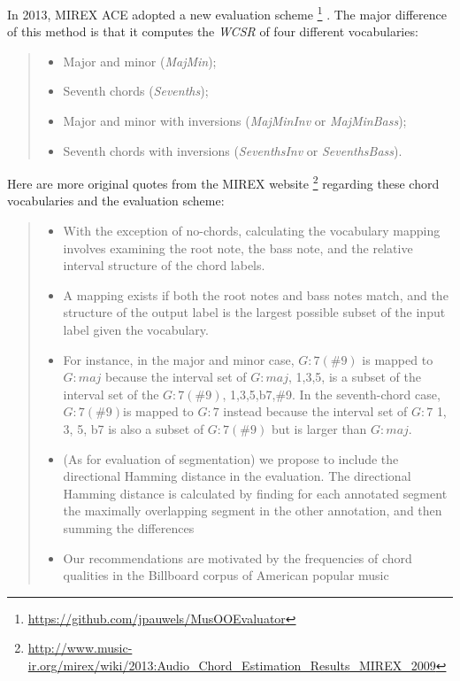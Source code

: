 In 2013, MIREX ACE adopted a new evaluation scheme \footnote{\url{https://github.com/jpauwels/MusOOEvaluator}} \cite{pauwels2013evaluating}. The major difference of this method is that it computes the \textit{WCSR} of four different vocabularies:
\begin{quote}
\begin{itemize}
\item Major and minor ({\it MajMin});
\item Seventh chords ({\it Sevenths});
\item Major and minor with inversions ({\it MajMinInv} or {\it MajMinBass});
\item Seventh chords with inversions ({\it SeventhsInv} or {\it SeventhsBass}).
\end{itemize}
\end{quote}
Here are more original quotes from the MIREX website \footnote{\url{http://www.music-ir.org/mirex/wiki/2013:Audio\_Chord\_Estimation\_Results\_MIREX\_2009}} regarding these chord vocabularies and the evaluation scheme:
\begin{quote}
\begin{itemize}
\item With the exception of no-chords, calculating the vocabulary mapping involves examining the root note, the bass note, and the relative interval structure of the chord labels.
\item A mapping exists if both the root notes and bass notes match, and the structure of the output label is the largest possible subset of the input label given the vocabulary.
\item For instance, in the major and minor case, $G:7(\#9)$ is mapped to $G:maj$ because the interval set of $G:maj$, {1,3,5}, is a subset of the interval set of the $G:7(\#9)$, {1,3,5,b7,\#9}. In the seventh-chord case, $G:7(\#9)$is mapped to $G:7$ instead because the interval set of $G:7$ {1, 3, 5, b7} is also a subset of $G:7(\#9)$ but is larger than $G:maj$.
\item (As for evaluation of segmentation) we propose to include the directional Hamming distance in the evaluation. The directional Hamming distance is calculated by finding for each annotated segment the maximally overlapping segment in the other annotation, and then summing the differences \cite{abdallah2005theory,mauch2010automatic}
\item Our recommendations are motivated by the frequencies of chord qualities in the Billboard corpus of American popular music \cite{burgoyne2011expert}
\end{itemize}
\end{quote}
